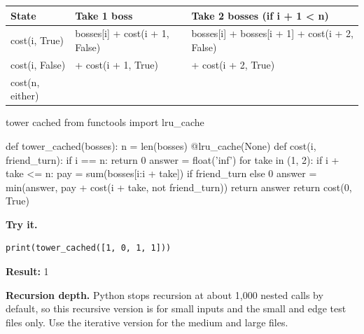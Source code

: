 \documentclass[11pt,a4paper,oneside]{report}
\begin{document}
\par\medskip\begingroup\small\setlength{\tabcolsep}{4pt}\renewcommand{\arraystretch}{1.3}\begin{tabularx}{\linewidth}{>{\raggedright\arraybackslash}p{26mm}>{\raggedright\arraybackslash}X>{\raggedright\arraybackslash}X}\toprule\textbf{State} & \textbf{Take 1 boss} & \textbf{Take 2 bosses (if i + 1 < n)}\\\midrule
{}cost(i, True) & bosses[i] + cost(i + 1, False) & bosses[i] + bosses[i + 1] + cost(i + 2, False)\\
{}cost(i, False) & 0 + cost(i + 1, True) & 0 + cost(i + 2, True)\\
{}cost(n, either) & 0 & \\
\bottomrule\end{tabularx}\endgroup\par\medskip
{}
\begin{bookcode}{tower cached}
from functools import lru_cache

def tower_cached(bosses):
    n = len(bosses)
    @lru_cache(None)
    def cost(i, friend_turn):
        if i == n:
            return 0
        answer = float('inf')
        for take in (1, 2):
            if i + take <= n:
                pay = sum(bosses[i:i + take]) if friend_turn else 0
                answer = min(answer, pay + cost(i + take, not friend_turn))
        return answer
    return cost(0, True)
\end{bookcode}
\textbf{Try it.}

\begin{lstlisting}
print(tower_cached([1, 0, 1, 1]))
\end{lstlisting}
\textbf{Result:} 1

\textbf{Recursion depth.} Python stops recursion at about 1,000 nested calls by default, so this recursive version is for small inputs and the small and edge test files only. Use the iterative version for the medium and large files.
\end{document}
